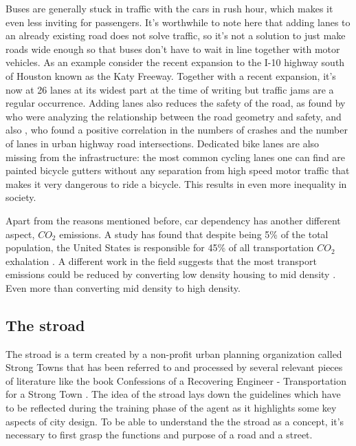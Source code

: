 \documentclass[
]{elteikthesis}[2023/04/10]
\begin{document}
Buses are generally stuck in traffic with the cars in rush hour, which
makes it even less inviting for passengers. It's worthwhile to note
here that adding lanes to an already existing road does not solve
traffic, so it's not a solution to just make roads wide enough so
that buses don't have to wait in line together with motor vehicles.
As an example consider the recent expansion to the I-10 highway south
of Houston known as the Katy Freeway. Together with a recent expansion,
it's now at 26 lanes at its widest part at the time of writing but
traffic jams are a regular occurrence. Adding lanes also reduces the
safety of the road, as found by \cite{milton1998relationship} who
were analyzing the relationship between the road geometry and safety,
and also \cite{abdel2000modeling}, who found a positive correlation
in the numbers of crashes and the number of lanes in urban highway
road intersections. Dedicated bike lanes are also missing from the
infrastructure: the most common cycling lanes one can find are painted
bicycle gutters without any separation from high speed motor traffic
that makes it very dangerous to ride a bicycle. This results in even
more inequality in society. 

Apart from the reasons mentioned before, car dependency has another
different aspect, $CO_{2}$ emissions. A study has found that despite
being 5\% of the total population, the United States is responsible
for 45\% of all transportation $CO_{2}$ exhalation \cite{decicco2006global}.
A different work in the field suggests that the most transport emissions
could be reduced by converting low density housing to mid density
\cite{gately2015cities}. Even more than converting mid density to
high density.

\subsection{The stroad}

The stroad is a term created by a non-profit urban planning organization
called Strong Towns that has been referred to and processed by several
relevant pieces of literature like the book Confessions of a Recovering
Engineer - Transportation for a Strong Town \cite{marohn2021confessions}.
The idea of the stroad lays down the guidelines which have to be reflected
during the training phase of the agent as it highlights some key aspects
of city design. To be able to understand the the stroad as a concept,
it's necessary to first grasp the functions and purpose of a road
and a street.
\end{document}
